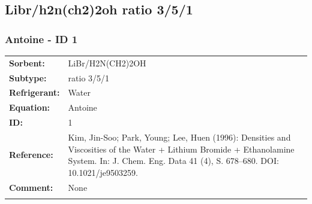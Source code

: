 \subsection{Libr/h2n(ch2)2oh  ratio 3/5/1}
%
\subsubsection{Antoine - ID 1}
%
\begin{tabular}[l]{|lp{11.5cm}|}
\hline
\addlinespace

\textbf{Sorbent:} & LiBr/H2N(CH2)2OH  \\
\textbf{Subtype:} & ratio 3/5/1 \\
\textbf{Refrigerant:} & Water \\
\textbf{Equation:} & Antoine \\
\textbf{ID:} & 1 \\
\textbf{Reference:} & Kim, Jin-Soo; Park, Young; Lee, Huen (1996): Densities and Viscosities of the Water + Lithium Bromide + Ethanolamine System. In: J. Chem. Eng. Data 41 (4), S. 678–680. DOI: 10.1021/je9503259. \\
\textbf{Comment:} & None \\

\addlinespace
\hline
\end{tabular}
\newline

